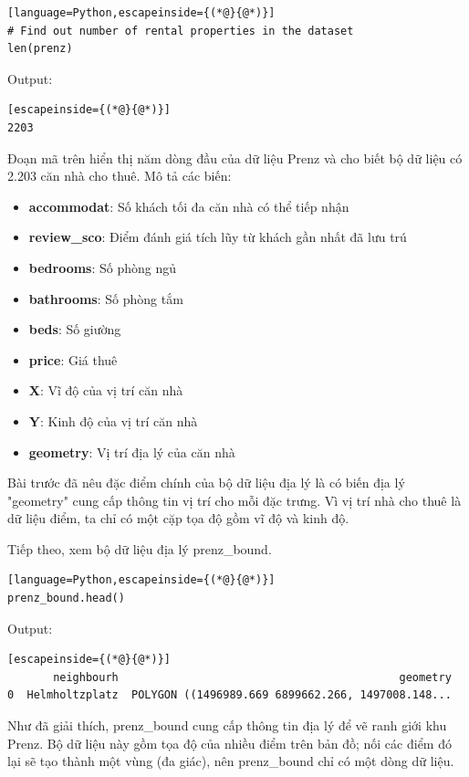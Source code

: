 \begin{lstlisting}[language=Python,escapeinside={(*@}{@*)}]
# Find out number of rental properties in the dataset
len(prenz)
\end{lstlisting}

Output:

\begin{lstlisting}[escapeinside={(*@}{@*)}]
2203
\end{lstlisting}

Đoạn mã trên hiển thị năm dòng đầu của dữ liệu Prenz và cho biết bộ dữ liệu có 2.203 căn nhà cho thuê. Mô tả các biến:

\begin{itemize}
\item
  \textbf{accommodat}: Số khách tối đa căn nhà có thể tiếp nhận
\item
  \textbf{review\_sco}: Điểm đánh giá tích lũy từ khách gần nhất đã lưu trú
\item
  \textbf{bedrooms}: Số phòng ngủ
\item
  \textbf{bathrooms}: Số phòng tắm
\item
  \textbf{beds}: Số giường
\item
  \textbf{price}: Giá thuê
\item
  \textbf{X}: Vĩ độ của vị trí căn nhà
\item
  \textbf{Y}: Kinh độ của vị trí căn nhà
\item
  \textbf{geometry}: Vị trí địa lý của căn nhà
\end{itemize}

Bài trước đã nêu đặc điểm chính của bộ dữ liệu địa lý là có biến địa lý "geometry" cung cấp thông tin vị trí cho mỗi đặc trưng. Vì vị trí nhà cho thuê là dữ liệu điểm, ta chỉ có một cặp tọa độ gồm vĩ độ và kinh độ.

Tiếp theo, xem bộ dữ liệu địa lý prenz\_bound.

\begin{lstlisting}[language=Python,escapeinside={(*@}{@*)}]
prenz_bound.head()
\end{lstlisting}

Output:

\begin{lstlisting}[escapeinside={(*@}{@*)}]
       neighbourh                                           geometry
0  Helmholtzplatz  POLYGON ((1496989.669 6899662.266, 1497008.148...
\end{lstlisting}

Như đã giải thích, prenz\_bound cung cấp thông tin địa lý để vẽ ranh giới khu Prenz. Bộ dữ liệu này gồm tọa độ của nhiều điểm trên bản đồ; nối các điểm đó lại sẽ tạo thành một vùng (đa giác), nên prenz\_bound chỉ có một dòng dữ liệu.

